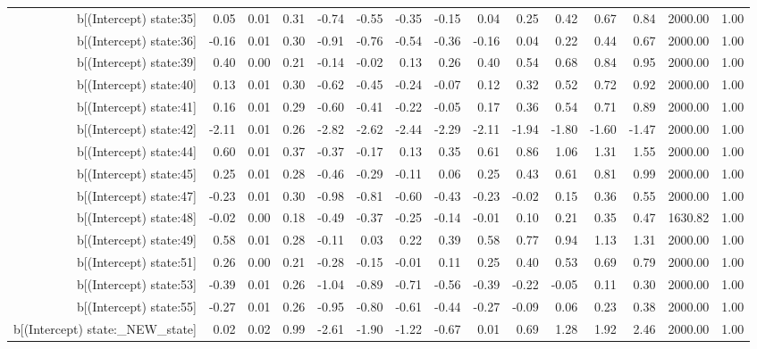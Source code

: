 \begin{table}[ht]
\begin{tabular}{rrrrrrrrrrrrrrr}
  b[(Intercept) state:35] & 0.05 & 0.01 & 0.31 & -0.74 & -0.55 & -0.35 & -0.15 & 0.04 & 0.25 & 0.42 & 0.67 & 0.84 & 2000.00 & 1.00 \\ 
  b[(Intercept) state:36] & -0.16 & 0.01 & 0.30 & -0.91 & -0.76 & -0.54 & -0.36 & -0.16 & 0.04 & 0.22 & 0.44 & 0.67 & 2000.00 & 1.00 \\ 
  b[(Intercept) state:39] & 0.40 & 0.00 & 0.21 & -0.14 & -0.02 & 0.13 & 0.26 & 0.40 & 0.54 & 0.68 & 0.84 & 0.95 & 2000.00 & 1.00 \\ 
  b[(Intercept) state:40] & 0.13 & 0.01 & 0.30 & -0.62 & -0.45 & -0.24 & -0.07 & 0.12 & 0.32 & 0.52 & 0.72 & 0.92 & 2000.00 & 1.00 \\ 
  b[(Intercept) state:41] & 0.16 & 0.01 & 0.29 & -0.60 & -0.41 & -0.22 & -0.05 & 0.17 & 0.36 & 0.54 & 0.71 & 0.89 & 2000.00 & 1.00 \\ 
  b[(Intercept) state:42] & -2.11 & 0.01 & 0.26 & -2.82 & -2.62 & -2.44 & -2.29 & -2.11 & -1.94 & -1.80 & -1.60 & -1.47 & 2000.00 & 1.00 \\ 
  b[(Intercept) state:44] & 0.60 & 0.01 & 0.37 & -0.37 & -0.17 & 0.13 & 0.35 & 0.61 & 0.86 & 1.06 & 1.31 & 1.55 & 2000.00 & 1.00 \\ 
  b[(Intercept) state:45] & 0.25 & 0.01 & 0.28 & -0.46 & -0.29 & -0.11 & 0.06 & 0.25 & 0.43 & 0.61 & 0.81 & 0.99 & 2000.00 & 1.00 \\ 
  b[(Intercept) state:47] & -0.23 & 0.01 & 0.30 & -0.98 & -0.81 & -0.60 & -0.43 & -0.23 & -0.02 & 0.15 & 0.36 & 0.55 & 2000.00 & 1.00 \\ 
  b[(Intercept) state:48] & -0.02 & 0.00 & 0.18 & -0.49 & -0.37 & -0.25 & -0.14 & -0.01 & 0.10 & 0.21 & 0.35 & 0.47 & 1630.82 & 1.00 \\ 
  b[(Intercept) state:49] & 0.58 & 0.01 & 0.28 & -0.11 & 0.03 & 0.22 & 0.39 & 0.58 & 0.77 & 0.94 & 1.13 & 1.31 & 2000.00 & 1.00 \\ 
  b[(Intercept) state:51] & 0.26 & 0.00 & 0.21 & -0.28 & -0.15 & -0.01 & 0.11 & 0.25 & 0.40 & 0.53 & 0.69 & 0.79 & 2000.00 & 1.00 \\ 
  b[(Intercept) state:53] & -0.39 & 0.01 & 0.26 & -1.04 & -0.89 & -0.71 & -0.56 & -0.39 & -0.22 & -0.05 & 0.11 & 0.30 & 2000.00 & 1.00 \\ 
  b[(Intercept) state:55] & -0.27 & 0.01 & 0.26 & -0.95 & -0.80 & -0.61 & -0.44 & -0.27 & -0.09 & 0.06 & 0.23 & 0.38 & 2000.00 & 1.00 \\ 
  b[(Intercept) state:\_NEW\_state] & 0.02 & 0.02 & 0.99 & -2.61 & -1.90 & -1.22 & -0.67 & 0.01 & 0.69 & 1.28 & 1.92 & 2.46 & 2000.00 & 1.00 \\ 

\end{tabular}
\end{table}
